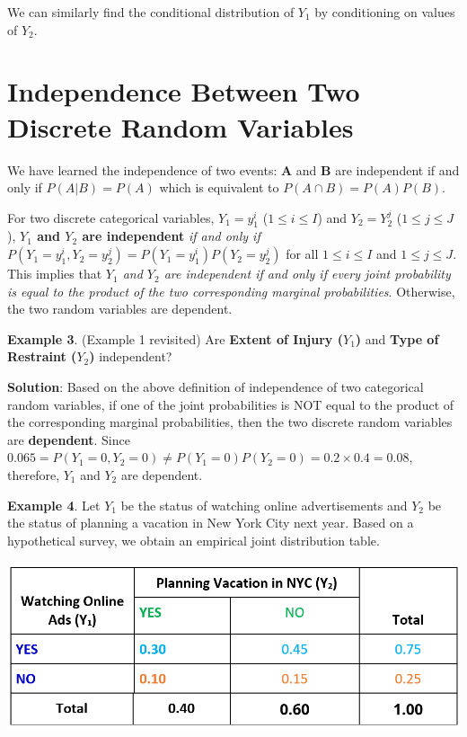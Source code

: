 \documentclass[
]{book}
\begin{document}
We can similarly find the conditional distribution of \(Y_1\) by conditioning on values of \(Y_2\).

\hfill\break

\hypertarget{independence-between-two-discrete-random-variables}{%
\section{Independence Between Two Discrete Random Variables}\label{independence-between-two-discrete-random-variables}}

\hfill\break

We have learned the independence of two events: \textbf{A} and \textbf{B} are independent if and only if \(P(A|B) = P(A)\) which is equivalent to \(P(A\cap B) = P(A)P(B)\).

For two discrete categorical variables, \(Y_1 =y_1^i\) (\(1 \le i \le I\)) and \(Y_2=Y_2^j\) (\(1 \le j \le J\)), \textbf{\(Y_1\) and \(Y_2\) are independent} \emph{if and only if} \(P(Y_1=y_1^i, Y_2=y_2^j) = P(Y_1 =y_1^i)P(Y_2 = y_2^j)\) for all \(1 \le i \le I\) and \(1 \le j \le J\). This implies that \emph{\(Y_1\) and \(Y_2\) are independent if and only if every joint probability is equal to the product of the two corresponding marginal probabilities}. Otherwise, the two random variables are dependent.

\hfill\break

\textbf{Example 3}. (Example 1 revisited) Are \textbf{Extent of Injury (\(Y_1\))} and \textbf{Type of Restraint (\(Y_2\))} independent?

\textbf{Solution}: Based on the above definition of independence of two categorical random variables, if one of the joint probabilities is NOT equal to the product of the corresponding marginal probabilities, then the two discrete random variables are \textbf{dependent}. Since \(0.065 = P(Y_1 =0, Y_2 = 0) \ne P(Y_1=0)P(Y_2 =0) = 0.2\times 0.4 = 0.08\), therefore, \(Y_1\) and \(Y_2\) are dependent.

\hfill\break

\textbf{Example 4}. Let \(Y_1\) be the status of watching online advertisements and \(Y_2\) be the status of planning a vacation in New York City next year. Based on a hypothetical survey, we obtain an empirical joint distribution table.

\begin{center}\includegraphics[width=0.65\linewidth]{topic07/independentTwoWayTable} \end{center}
\end{document}
